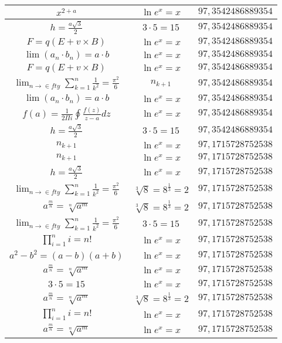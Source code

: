 \documentclass{article}
\begin{document}
\begin{flushleft}
\begin{longtable}{|c|c|c|}
$x^{2+a}$ & $\ln e^x=x$ & $97,3542486889354$ \\ \hline 
$h=\frac{a\sqrt{3}}{2}$ & $3\cdot 5=15$ & $97,3542486889354$ \\ \hline 
$F=q\left(E+v\times B\right)$ & $\ln e^x=x$ & $97,3542486889354$ \\ \hline 
$\lim\left(a_n\cdot b_n\right)=a\cdot b$ & $\ln e^x=x$ & $97,3542486889354$ \\ \hline 
$F=q\left(E+v\times B\right)$ & $\ln e^x=x$ & $97,3542486889354$ \\ \hline 
$\lim_{n\to\in fty}\sum_{k=1}^n\frac{1}{k^2}=\frac{\pi^2}{6}$ & $n_{k+1}$ & $97,3542486889354$ \\ \hline 
$\lim\left(a_n\cdot b_n\right)=a\cdot b$ & $\ln e^x=x$ & $97,3542486889354$ \\ \hline 
$f\left(a\right)=\frac{1}{2\Pi i}\oint\frac{f\left(z\right)}{z-a}dz$ & $\ln e^x=x$ & $97,3542486889354$ \\ \hline 
$h=\frac{a\sqrt{3}}{2}$ & $3\cdot 5=15$ & $97,3542486889354$ \\ \hline 
$n_{k+1}$ & $\ln e^x=x$ & $97,1715728752538$ \\ \hline 
$n_{k+1}$ & $\ln e^x=x$ & $97,1715728752538$ \\ \hline 
$h=\frac{a\sqrt{3}}{2}$ & $\ln e^x=x$ & $97,1715728752538$ \\ \hline 
$\lim_{n\to\in fty}\sum_{k=1}^n\frac{1}{k^2}=\frac{\pi^2}{6}$ & $\sqrt[3]{8}=8^{\frac{1}{3}}=2$ & $97,1715728752538$ \\ \hline 
$a^{\frac{m}{n}}=\sqrt[n]{a^{m}}$ & $\sqrt[3]{8}=8^{\frac{1}{3}}=2$ & $97,1715728752538$ \\ \hline 
$\lim_{n\to\in fty}\sum_{k=1}^n\frac{1}{k^2}=\frac{\pi^2}{6}$ & $3\cdot 5=15$ & $97,1715728752538$ \\ \hline 
$\prod_{i=1}^ni=n!$ & $\ln e^x=x$ & $97,1715728752538$ \\ \hline 
$a^2-b^2=(a-b)(a+b)$ & $\ln e^x=x$ & $97,1715728752538$ \\ \hline 
$a^{\frac{m}{n}}=\sqrt[n]{a^{m}}$ & $\ln e^x=x$ & $97,1715728752538$ \\ \hline 
$3\cdot 5=15$ & $\ln e^x=x$ & $97,1715728752538$ \\ \hline 
$a^{\frac{m}{n}}=\sqrt[n]{a^{m}}$ & $\sqrt[3]{8}=8^{\frac{1}{3}}=2$ & $97,1715728752538$ \\ \hline 
$\prod_{i=1}^ni=n!$ & $\ln e^x=x$ & $97,1715728752538$ \\ \hline 
$a^{\frac{m}{n}}=\sqrt[n]{a^{m}}$ & $\ln e^x=x$ & $97,1715728752538$ \\ \hline 

\end{longtable}
\end{flushleft}
\end{document}
